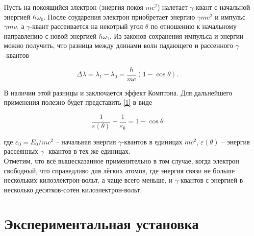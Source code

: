 \documentclass[15pt,a5paper,reqno]{article}
\begin{document}
Пусть на покоящийся электрон (энергия покоя $mc^2$) налетает $\gamma$-квант с начальной энергией $\hbar \omega_0$. После соударения электрон приобретает энергию $\gamma mc^2$ и импульс $\gamma mv$, а $\gamma$-квант рассеивается на некотрый угол $\theta$ по отношению к начальному направлению с новой энергией $\hbar \omega_1$. Из законов сохранения импульса и энергии можно получить, что разница между длинами волн падающего и рассенного $\gamma$-квантов

\begin{equation}\label{1}
    \Delta \lambda = \lambda_1 - \lambda_0 = \dfrac{h}{mc} (1-\cos \theta).
\end{equation}

В наличии этой разницы и заключается эффект Комптона. Для дальнейшего применения полезно будет представить \eqref{1} в виде

\begin{equation}\label{2}
  \frac{1}{\varepsilon(\theta)} - \dfrac{1}{\varepsilon_0} = 1 - \cos \theta
\end{equation}


где $\varepsilon_0 = E_0/mc^2$ -- начальная энергия $\gamma$-квантов в единицах $mc^2$, $\varepsilon(\theta)$ -- энергия рассеянных $\gamma$ -квантов в тех же единицах.\\

Отметим, что всё вышесказанное применительно в том случае, когда электрон свободный, что справедливо для лёгких атомов, где энергия связи не больше нескольких килоэлектрон-вольт, а чаще всего меньше, и $\gamma$-квантов с энергией в несколько десятков-сотен килоэлектрон-вольт.

\section{Экспериментальная установка}
\end{document}
